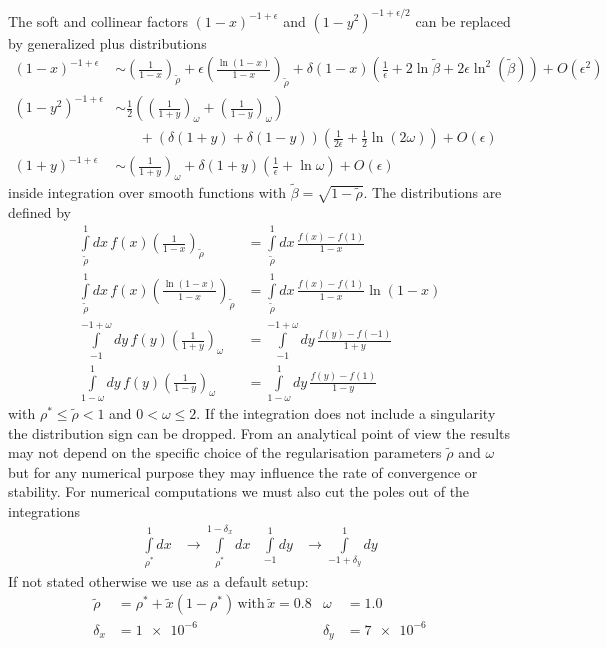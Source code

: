 The soft and collinear factors $(1-x)^{-1+\epsilon}$ and $(1-y^2)^{-1+\epsilon/2}$ can be replaced by generalized plus distributions\cite{Harris:1995tu}
\begin{align}
(1-x)^{-1+\epsilon} &\sim \left(\frac 1 {1-x}\right)_{\tilde\rho} + \epsilon \left(\frac{\ln(1-x)}{1-x}\right)_{\tilde \rho} + \delta(1-x)\left(\frac 1 \epsilon + 2\ln\tilde\beta + 2\epsilon\ln^2(\tilde\beta)\right) + O(\epsilon^2)\\
(1-y^2)^{-1+\epsilon} &\sim \frac 1 2\left(\left(\frac 1 {1+y}\right)_\omega + \left(\frac 1 {1-y}\right)_\omega\right) \nonumber\\
 &\hspace{20pt} + \left(\delta(1+y)+\delta(1-y)\right)\left(\frac 1 {2\epsilon} + \frac 1 2\ln(2\omega)\right) + O(\epsilon)\\
(1+y)^{-1+\epsilon} &\sim \left(\frac 1 {1+y}\right)_\omega + \delta(1+y)\left(\frac 1 \epsilon + \ln\omega\right) + O(\epsilon)
\end{align}
inside integration over smooth functions with $\tilde \beta = \sqrt{1-\tilde\rho}$. The distributions are defined by
\begin{align}
\int\limits_{\tilde\rho}^1\!\!dx\,f(x)\left(\frac 1 {1-x}\right)_{\tilde\rho} &= \int\limits_{\tilde\rho}^1\!\!dx\,\frac {f(x) - f(1)} {1-x}\\
\int\limits_{\tilde\rho}^1\!\!dx\,f(x)\left(\frac {\ln(1-x)} {1-x}\right)_{\tilde\rho} &= \int\limits_{\tilde\rho}^1\!\!dx\,\frac {f(x) - f(1)} {1-x}\ln(1-x)\\
\int\limits_{-1}^{-1+\omega}\!\!\!dy\,f(y)\left(\frac 1 {1+y}\right)_{\omega} &= \int\limits_{-1}^{-1+\omega}\!\!\!dy\,\frac {f(y)-f(-1)} {1+y}\\
\int\limits_{1-\omega}^{1}\!\!dy\,f(y)\left(\frac 1 {1-y}\right)_{\omega} &= \int\limits_{1-\omega}^{1}\!\!dy\,\frac {f(y)-f(1)} {1-y}
\end{align}
with $\rho^*\leq\tilde\rho < 1$ and $0<\omega\leq 2$. If the integration does not include a singularity the distribution sign can be dropped. From an analytical point of view the results may not depend on the specific choice of the regularisation parameters $\tilde\rho$ and $\omega$ but for any numerical purpose they may influence the rate of convergence or stability. For numerical computations we must also cut the poles out of the integrations
\begin{align}
\int\limits_{\rho^*}^1\!dx &\rightarrow \int\limits_{\rho^*}^{1-\delta_x}\!\!\!dx &\int\limits_{-1}^1\!dy &\rightarrow \int\limits_{-1+\delta_y}^{1}\!\!dy
\end{align}
If not stated otherwise we use as a default setup:
\begin{align}
\tilde\rho &= \rho^* + \tilde x(1-\rho^*)\,\text{with}\, \tilde x=0.8 &\omega &= 1.0\\
\delta_x &= \num{1e-6} &\delta_y &=\num{7e-6}
\end{align}

